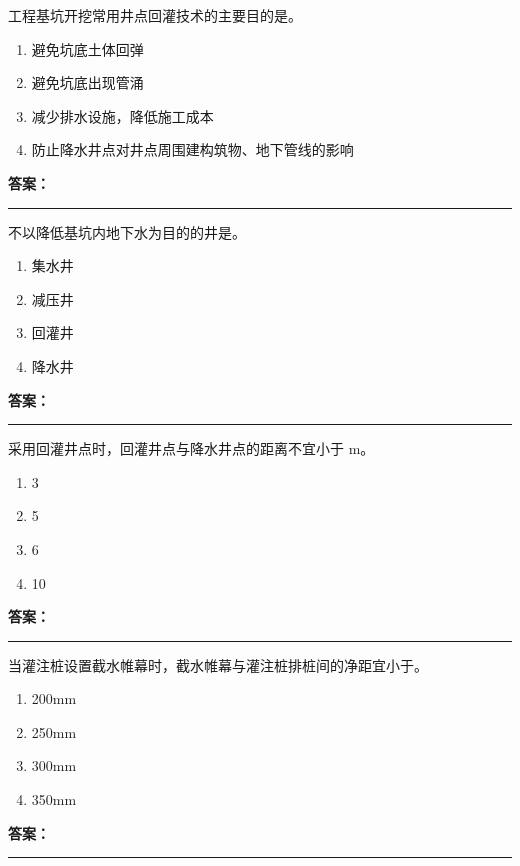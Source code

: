 \documentclass[UTF8,fontset=fandol,11pt]{ctexart}
\newcommand{\answerline}{\textcolor{answerred}{\rule{2.4cm}{0.7pt}}}
\begin{document}
\vspace{0.2em}

\begin{quizbox}[title={第 18 题}]
工程基坑开挖常用井点回灌技术的主要目的是。\\
\begin{enumerate}[label=\Alph*.]
\item 避免坑底土体回弹
\item 避免坑底出现管涌
\item 减少排水设施，降低施工成本
\item 防止降水井点对井点周围建构筑物、地下管线的影响
\end{enumerate}
\textbf{\textcolor{answerred}{答案：}} \answerline
\end{quizbox}

\vspace{0.2em}

\begin{quizbox}[title={第 19 题}]
不以降低基坑内地下水为目的的井是。\\
\begin{enumerate}[label=\Alph*.]
\item 集水井
\item 减压井
\item 回灌井
\item 降水井
\end{enumerate}
\textbf{\textcolor{answerred}{答案：}} \answerline
\end{quizbox}

\vspace{0.2em}

\begin{quizbox}[title={第 20 题}]
采用回灌井点时，回灌井点与降水井点的距离不宜小于 m。\\
\begin{enumerate}[label=\Alph*.]
\item 3
\item 5
\item 6
\item 10
\end{enumerate}
\textbf{\textcolor{answerred}{答案：}} \answerline
\end{quizbox}

\vspace{0.2em}

\begin{quizbox}[title={第 21 题}]
当灌注桩设置截水帷幕时，截水帷幕与灌注桩排桩间的净距宜小于。\\
\begin{enumerate}[label=\Alph*.]
\item 200mm
\item 250mm
\item 300mm
\item 350mm
\end{enumerate}
\textbf{\textcolor{answerred}{答案：}} \answerline
\end{quizbox}
\end{document}
